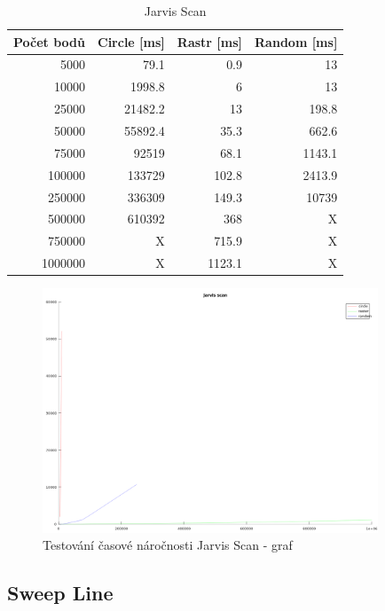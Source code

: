 \documentclass[a4paper, 12pt]{article}
\begin{document}
\begin{table}[h!]
	\centering
	\begin{tabular}{|r|r|r|r|}
	\hline
	 \textbf{Počet bodů} 	& \textbf{Circle [ms]} & \textbf{Rastr [ms]}  & \textbf{Random [ms]} \\ \hline
	 5000 & 79.1 & 0.9 & 13   \\ \hline
	10000 & 1998.8 & 6 & 13   \\ \hline
	25000 & 21482.2 & 13 & 198.8  \\ \hline
	50000 & 55892.4 & 35.3 & 662.6   \\ \hline
	75000 & 92519 & 68.1 & 1143.1 \\ \hline
	100000 & 133729 & 102.8 & 2413.9  \\ \hline
	250000 & 336309 & 149.3 & 10739   \\ \hline
	500000 & 610392 & 368 & X  \\ \hline
	750000 & X & 715.9 & X  \\ \hline
	1000000 & X & 1123.1 & X  \\ \hline
	
	\end{tabular}
		\caption{Jarvis Scan}
\end{table}

\begin{figure}[h!]
	\centering
	\includegraphics[width=10cm]{figure_jarvis_scan.png}
	\caption{Testování časové náročnosti Jarvis Scan - graf}
\end{figure}

\newpage
\subsection{Sweep Line}
\end{document}
